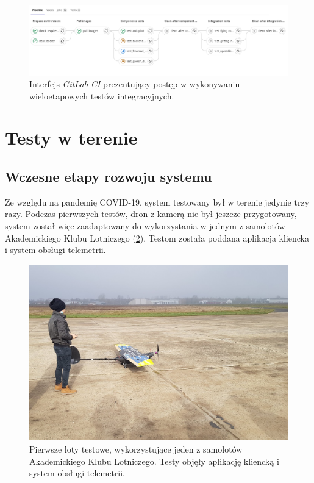 \begin{figure}[H]
	\centering
	\includegraphics[width=\linewidth]{rys05/pipeline.png}
    \caption{
        Interfejs \textit{GitLab CI} prezentujący postęp w wykonywaniu
        wieloetapowych testów integracyjnych.
    }
	\label{pipeline_gitlab_ci}
\end{figure}

\section{Testy w terenie}

\subsection{Wczesne etapy rozwoju systemu} \label{early_tests}

Ze względu na pandemię COVID-19, system testowany był w terenie jedynie trzy razy.
Podczas pierwszych testów, dron z kamerą nie był jeszcze przygotowany, system został więc 
zaadaptowany do wykorzystania w jednym z samolotów Akademickiego Klubu Lotniczego (\ref{test_sae}).
Testom została poddana aplikacja kliencka i system obsługi telemetrii.

\begin{figure}[H]
	\centering
	\includegraphics[width=0.8\linewidth]{rys05/test_sae.jpg}
    \caption{
        Pierwsze loty testowe, wykorzystujące jeden z samolotów Akademickiego
        Klubu Lotniczego. Testy objęły aplikację kliencką i system obsługi telemetrii.
    }
	\label{test_sae}
\end{figure}

